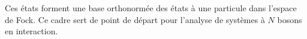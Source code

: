 Ces états forment une base orthonormée des états à une particule dans l’espace de Fock. Ce cadre sert de point de départ pour l’analyse de systèmes à \(N\) bosons en interaction.




